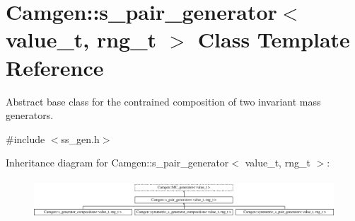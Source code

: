 \hypertarget{a00495}{}\section{Camgen\+:\+:s\+\_\+pair\+\_\+generator$<$ value\+\_\+t, rng\+\_\+t $>$ Class Template Reference}
\label{a00495}


Abstract base class for the contrained composition of two invariant mass generators.  




{\ttfamily \#include $<$ss\+\_\+gen.\+h$>$}

Inheritance diagram for Camgen\+:\+:s\+\_\+pair\+\_\+generator$<$ value\+\_\+t, rng\+\_\+t $>$\+:\begin{figure}[H]
\begin{center}
\leavevmode
\includegraphics[height=1.477573cm]{a00495}
\end{center}
\end{figure}
